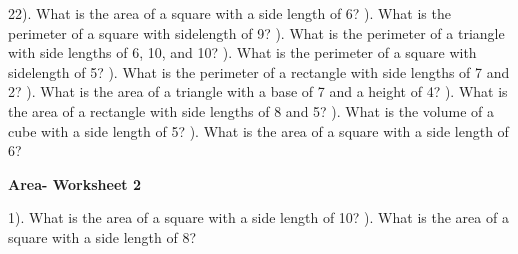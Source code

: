 \documentclass{article}%
\begin{document}
22). What is the area of a square with a side length of 6?%
\newline%
\newline%
). What is the perimeter of a square with sidelength of 9?%
\newline%
\newline%
). What is the perimeter of a triangle with side lengths of 6, 10, and 10?%
\newline%
\newline%
). What is the perimeter of a square with sidelength of 5?%
\newline%
\newline%
). What is the perimeter of a rectangle with side lengths of 7 and 2?%
\newline%
\newline%
). What is the area of a triangle with a base of 7 and a height of 4?%
\newline%
\newline%
). What is the area of a rectangle with side lengths of 8 and 5?%
\newline%
\newline%
). What is the volume of a cube with a side length of 5?%
\newline%
\newline%
). What is the area of a square with a side length of 6?%
\newline%
\newline%
\newline%
\pagebreak%
\large%
\begin{center}%
\textbf{Area- Worksheet 2}%
\newline%
\newline%
\newline%
\end{center} \normalsize%
1). What is the area of a square with a side length of 10?%
\newline%
\newline%
). What is the area of a square with a side length of 8?%
\newline%
\newline%
\end{document}
